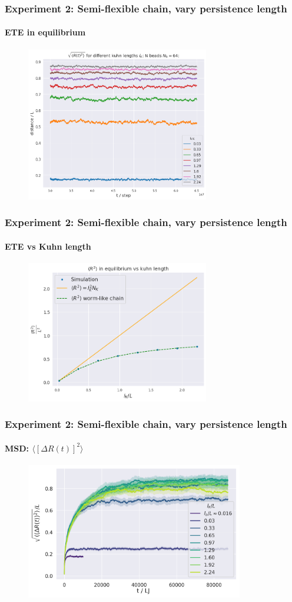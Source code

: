 \documentclass[handout]{beamer}
\newcommand{\mean}[1]{\langle #1 \rangle}
\begin{document}
\begin{frame}
    \frametitle{Experiment 2: Semi-flexible chain, vary persistence length}
    \framesubtitle{ETE in equilibrium}

    \begin{figure}[h]
        \includegraphics[width=8cm]{./4-exp-R_equi.png}
    \end{figure}
\end{frame}


\begin{frame}
    \frametitle{Experiment 2: Semi-flexible chain, vary persistence length}
    \framesubtitle{ETE vs Kuhn length}

    \begin{figure}[h]
        \includegraphics[width=8cm]{./4-exp-R_sim_vs_theor.png}
    \end{figure}
\end{frame}


\begin{frame}
    \frametitle{Experiment 2: Semi-flexible chain, vary persistence length}
    \framesubtitle{MSD: $\mean{[\Delta R(t)]^2}$}

    \begin{figure}[h]
        \includegraphics[width=9.5cm]{./4-exp-delta_R-bare.png}
    \end{figure}
\end{frame}
\end{document}
